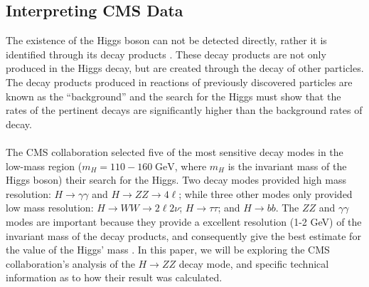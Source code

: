 \documentclass[12pt]{article}
\newcommand{\npar}{\\ \\ \noindent}
\begin{document}
\subsection{Interpreting CMS Data}
The existence of the Higgs boson can not be detected directly, rather it is identified through its decay products \cite{higgs_search}. These decay products are not only produced in the Higgs decay, but are created through the decay of other particles. The decay products produced in reactions of previously discovered particles are known as the ``background'' and the search for the Higgs must show that the rates of the pertinent decays are significantly higher than the background rates of decay.
\npar
The CMS collaboration selected five of the most sensitive decay modes in the low-mass region ($m_H = 110-160 \; \text{GeV}$, where $m_H$ is the invariant mass of the Higgs boson) their search for the Higgs. Two decay modes provided high mass resolution: $H\rightarrow \gamma \gamma$ and $H \rightarrow ZZ \rightarrow 4\ell$; while three other modes only provided low mass resolution: $H \rightarrow WW \rightarrow 2\ell2\nu$; $H \rightarrow \tau \tau$; and $H \rightarrow bb$. The $ZZ$ and $\gamma \gamma$ modes are important because they provide a excellent resolution (1-2 GeV) of the invariant mass of the decay products, and consequently give the best estimate for the value of the Higgs' mass \cite{new_higgs}. In this paper, we will be exploring the CMS collaboration's analysis of the $H \to ZZ$ decay mode, and specific technical information as to how their result was calculated.
\end{document}
